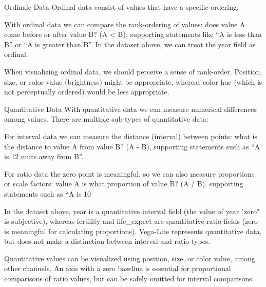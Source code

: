 \documentclass[notes, aspectratio=1610]{beamer}
\begin{document}
\begin{frame}{Ordinale Data}
	\small 
	Ordinal data consist of values that have a specific ordering.

	\vspace{1em}

        With ordinal data we can compare the rank-ordering of values: does value A come
	before or after value B? (A < B), supporting statements like “A is less than B”
	or “A is greater than B”. In the dataset above, we can treat the year field as
	ordinal.

	\vspace{1em}

	When visualizing ordinal data, we should perceive a sense of rank-order.
	Position, size, or color value (brightness) might be appropriate, whereas color
	hue (which is not perceptually ordered) would be less appropriate.

\end{frame}

\begin{frame}{Quantitative Data}
	\small 
	With quantitative data we can measure numerical differences among values. There are multiple sub-types of quantitative data:
	
	\vspace{1em}

	For interval data we can measure the distance (interval) between points: what is the distance to value A from value B? (A - B), supporting statements such as “A is 12 units away from B”.

	\vspace{1em}

	For ratio data the zero point is meaningful, so we can also measure proportions or scale factors: value A is what proportion of value B? (A / B), supporting statements such as “A is 10%

	\vspace{1em}

	In the dataset above, year is a quantitative interval field (the value of year "zero" is subjective), whereas fertility and life_expect are quantitative ratio fields (zero is meaningful for calculating proportions). Vega-Lite represents quantitative data, but does not make a distinction between interval and ratio types.

	\vspace{1em}

	Quantitative values can be visualized using position, size, or color value, among other channels. An axis with a zero baseline is essential for proportional comparisons of ratio values, but can be safely omitted for interval comparisons.
\end{frame}
\end{document}

